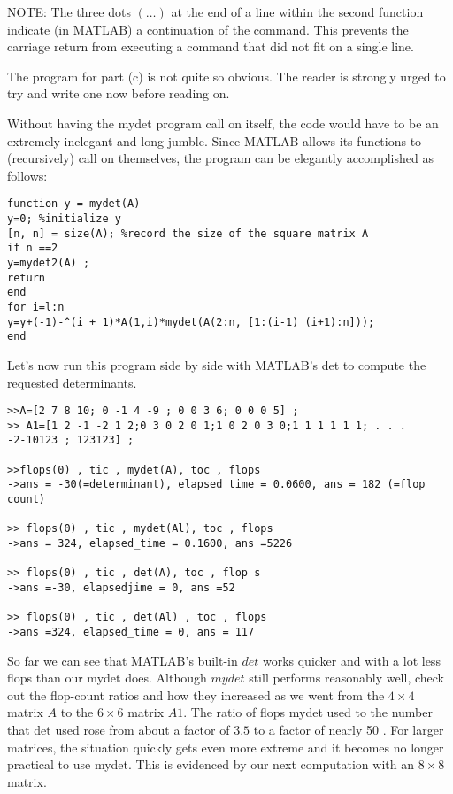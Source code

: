 \documentclass[../main.tex]{subfiles}
\begin{document}
NOTE: The three dots $(\ldots)$ at the end of a line within the second function indicate (in MATLAB) a continuation of the command. This prevents the carriage return from executing a command that did not fit on a single line.

The program for part (c) is not quite so obvious. The reader is strongly urged to try and write one now before reading on.

Without having the mydet program call on itself, the code would have to be an extremely inelegant and long jumble. Since MATLAB allows its functions to (recursively) call on themselves, the program can be elegantly accomplished as follows:

\begin{verbatim}
function y = mydet(A)
y=0; %initialize y
[n, n] = size(A); %record the size of the square matrix A
if n ==2
y=mydet2(A) ;
return
end
for i=l:n
y=y+(-1)-^(i + 1)*A(1,i)*mydet(A(2:n, [1:(i-1) (i+1):n]));
end 
\end{verbatim}

Let's now run this program side by side with MATLAB's det to compute the requested determinants.

\begin{verbatim}
>>A=[2 7 8 10; 0 -1 4 -9 ; 0 0 3 6; 0 0 0 5] ;
>> A1=[1 2 -1 -2 1 2;0 3 0 2 0 1;1 0 2 0 3 0;1 1 1 1 1 1; . . .
-2-10123 ; 123123] ;

>>flops(0) , tic , mydet(A), toc , flops
->ans = -30(=determinant), elapsed_time = 0.0600, ans = 182 (=flop count)

>> flops(0) , tic , mydet(Al), toc , flops
->ans = 324, elapsed_time = 0.1600, ans =5226

>> flops(0) , tic , det(A), toc , flop s
->ans =-30, elapsedjime = 0, ans =52

>> flops(0) , tic , det(Al) , toc , flops
->ans =324, elapsed_time = 0, ans = 117
\end{verbatim}

So far we can see that MATLAB's built-in $det$ works quicker and with a lot less
flops than our mydet does. Although $mydet$ still performs reasonably well, check out the flop-count ratios and how they increased as we went from the $4 \times 4$ matrix $A$ to the $6 \times 6$ matrix $A 1$. The ratio of flops mydet used to the number that det used rose from about a factor of $3.5$ to a factor of nearly 50 . For larger matrices, the situation quickly gets even more extreme and it becomes no longer practical to use mydet. This is evidenced by our next computation with an $8 \times 8$ matrix.\\
\end{document}
